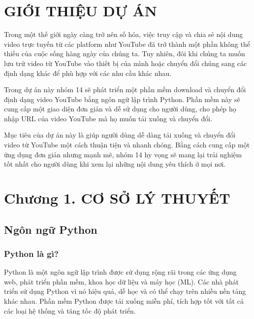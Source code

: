 \documentclass{article} %
\begin{document}
\tableofcontents 
\thispagestyle{empty}
\cleardoublepage

\section*{GIỚI THIỆU DỰ ÁN}
Trong một thế giới ngày càng trở nên số hóa, việc truy cập và chia sẻ nội dung video trực tuyến từ các platform như YouTube đã trở thành một phần không thể thiếu của cuộc sống hàng ngày của chúng ta. Tuy nhiên, đôi khi chúng ta muốn lưu trữ video từ YouTube vào thiết bị của mình hoặc chuyển đổi chúng sang các định dạng khác để phù hợp với các nhu cầu khác nhau. 

Trong dự án này nhóm 14 sẽ phát triển một phần mềm download và chuyển đổi định dạng video YouTube bằng ngôn ngữ lập trình Python. Phần mềm này sẽ cung cấp một giao diện đơn giản và dễ sử dụng cho người dùng, cho phép họ nhập URL của video YouTube mà họ muốn tải xuống và chuyển đổi. 

Mục tiêu của dự án này là giúp người dùng dễ dàng tải xuống và chuyển đổi video từ YouTube một cách thuận tiện và nhanh chóng. Bằng cách cung cấp một ứng dụng đơn giản nhưng mạnh mẽ, nhóm 14 hy vọng sẽ mang lại trải nghiệm tốt nhất cho người dùng khi xem lại những nội dung yêu thích ở mọi nơi.
\newpage
{} %
\section*{Chương 1. CƠ SỞ LÝ THUYẾT}
\setcounter{section}{1}
\subsection{Ngôn ngữ Python}
\subsubsection{Python là gì?}
Python là một ngôn ngữ lập trình được sử dụng rộng rãi trong các ứng 
dụng web, phát triển phần mềm, khoa học dữ liệu và máy học (ML). 
Các nhà phát triển sử dụng Python vì nó hiệu quả, dễ học và có thể chạy 
trên nhiều nền tảng khác nhau. Phần mềm Python được tải xuống miễn 
phí, tích hợp tốt với tất cả các loại hệ thống và tăng tốc độ phát triển.
\end{document}
